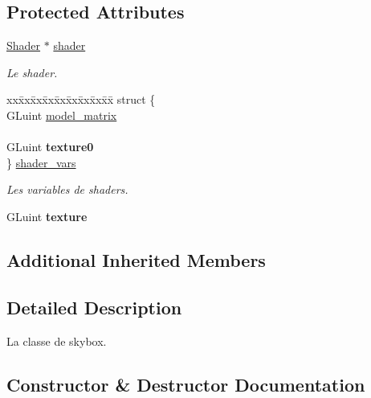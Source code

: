 \subsection*{Protected Attributes}
\begin{DoxyCompactItemize}
\item 
\mbox{\label{classSkyBox_afd602ee6db177094b5a5db8e4682fcd1}} 
\mbox{\hyperlink{classShader}{Shader}} $\ast$ \mbox{\hyperlink{classSkyBox_afd602ee6db177094b5a5db8e4682fcd1}{shader}}
\begin{DoxyCompactList}\small\item\em Le shader. \end{DoxyCompactList}\item 
\mbox{\label{classSkyBox_aaddd2913b22cacddfffa4d5c9487b10f}} 
\begin{tabbing}
xx\=xx\=xx\=xx\=xx\=xx\=xx\=xx\=xx\=\kill
struct \{\\
\>GLuint \mbox{\hyperlink{classSkyBox_aa169023b140d4b1fb328899bfa5ad83b}{model\_matrix}}\\
\>\\
\>GLuint {\bfseries texture0}\\
\} \mbox{\hyperlink{classSkyBox_aaddd2913b22cacddfffa4d5c9487b10f}{shader\_vars}}\\

\end{tabbing}\begin{DoxyCompactList}\small\item\em Les variables de shaders. \end{DoxyCompactList}\item 
\mbox{\label{classSkyBox_aba3fcdb5f5ff7d825d6a42aff3875d61}} 
G\+Luint {\bfseries texture}
\end{DoxyCompactItemize}
\subsection*{Additional Inherited Members}


\subsection{Detailed Description}
La classe de skybox. 



\subsection{Constructor \& Destructor Documentation}
\mbox{\label{classSkyBox_a548db645757da94296cb80402206dd3b}} 
